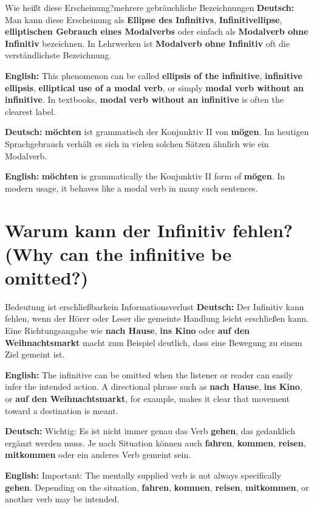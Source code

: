 \documentclass[a4paper,11pt]{article}
\newcommand{\GermanText}[1]{\textbf{Deutsch: }#1\par}
\newcommand{\EnglishText}[1]{{\small\color{SoftGray}\textbf{English: }#1\par}}
\begin{document}
        \begin{grammarentry}{Wie heißt diese Erscheinung?}{mehrere gebräuchliche Bezeichnungen}
            \GermanText{Man kann diese Erscheinung als \textbf{Ellipse des Infinitivs}, \textbf{Infinitivellipse}, \textbf{elliptischen Gebrauch eines Modalverbs} oder einfach als \textbf{Modalverb ohne Infinitiv} bezeichnen. In Lehrwerken ist \textbf{Modalverb ohne Infinitiv} oft die verständlichste Bezeichnung.}
            \EnglishText{This phenomenon can be called \textbf{ellipsis of the infinitive}, \textbf{infinitive ellipsis}, \textbf{elliptical use of a modal verb}, or simply \textbf{modal verb without an infinitive}. In textbooks, \textbf{modal verb without an infinitive} is often the clearest label.}

            \GermanText{\textbf{möchten} ist grammatisch der Konjunktiv II von \textbf{mögen}. Im heutigen Sprachgebrauch verhält es sich in vielen solchen Sätzen ähnlich wie ein Modalverb.}
            \EnglishText{\textbf{möchten} is grammatically the Konjunktiv II form of \textbf{mögen}. In modern usage, it behaves like a modal verb in many such sentences.}
        \end{grammarentry}

    \section{Warum kann der Infinitiv fehlen? \textnormal{(Why can the infinitive be omitted?)}}

        \begin{grammarentry}{Bedeutung ist erschließbar}{kein Informationsverlust}
            \GermanText{Der Infinitiv kann fehlen, wenn der Hörer oder Leser die gemeinte Handlung leicht erschließen kann. Eine Richtungsangabe wie \textbf{nach Hause}, \textbf{ins Kino} oder \textbf{auf den Weihnachtsmarkt} macht zum Beispiel deutlich, dass eine Bewegung zu einem Ziel gemeint ist.}
            \EnglishText{The infinitive can be omitted when the listener or reader can easily infer the intended action. A directional phrase such as \textbf{nach Hause}, \textbf{ins Kino}, or \textbf{auf den Weihnachtsmarkt}, for example, makes it clear that movement toward a destination is meant.}

            \GermanText{Wichtig: Es ist nicht immer genau das Verb \textbf{gehen}, das gedanklich ergänzt werden muss. Je nach Situation können auch \textbf{fahren}, \textbf{kommen}, \textbf{reisen}, \textbf{mitkommen} oder ein anderes Verb gemeint sein.}
            \EnglishText{Important: The mentally supplied verb is not always specifically \textbf{gehen}. Depending on the situation, \textbf{fahren}, \textbf{kommen}, \textbf{reisen}, \textbf{mitkommen}, or another verb may be intended.}
        \end{grammarentry}
\end{document}
